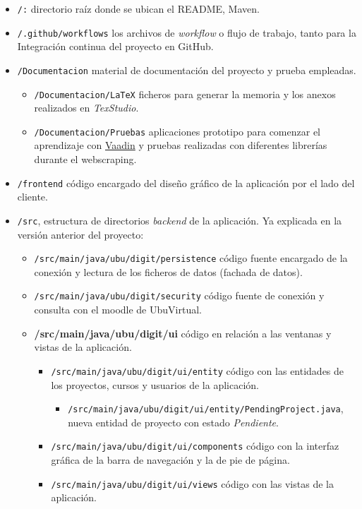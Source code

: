 \begin{itemize}
	\item \texttt{/:} directorio raíz donde se ubican el README, Maven. 
	\item \texttt{/.github/workflows} los archivos de \textit{workflow} o flujo de trabajo, tanto para la Integración continua del proyecto en GitHub.
	\item \texttt{/Documentacion} material de documentación del proyecto y prueba empleadas.
	\begin{itemize}
		\tightlist
		\item \texttt{/Documentacion/LaTeX} ficheros para generar la memoria y los anexos realizados en \emph{TexStudio}.
		\item \texttt{/Documentacion/Pruebas} aplicaciones prototipo para comenzar el aprendizaje con \href{https://vaadin.com/}{Vaadin} y pruebas realizadas con diferentes librerías durante el webscraping.
	\end{itemize}
	\item \texttt{/frontend} código encargado del diseño gráfico de la aplicación por el lado del cliente.
	\item \texttt{/src}, estructura de directorios \emph{backend} de la aplicación. Ya explicada en la versión anterior del proyecto:
		\begin{itemize}
			\item \texttt{/src/main/java/ubu/digit/persistence} código fuente encargado de la conexión y lectura de los ficheros de datos (fachada de datos).		
			\item \texttt{/src/main/java/ubu/digit/security} código fuente de conexión y consulta con el moodle de UbuVirtual.
			\item \textbf{/src/main/java/ubu/digit/ui} código en relación a las ventanas y vistas de la aplicación.
			\begin{itemize}
				\item \texttt{/src/main/java/ubu/digit/ui/entity} código con las entidades de los proyectos, cursos y usuarios de la aplicación.
					\begin{itemize}
						\item \texttt{/src/main/java/ubu/digit/ui/entity/PendingProject.java}, nueva entidad de proyecto con estado \emph{Pendiente}.
					\end{itemize}
				\item \texttt{/src/main/java/ubu/digit/ui/components} código con la interfaz gráfica de la barra de navegación y la de pie de página.
				\item \texttt{/src/main/java/ubu/digit/ui/views} código con las vistas de la aplicación.

\end{itemize}
\end{itemize}
\end{itemize}
